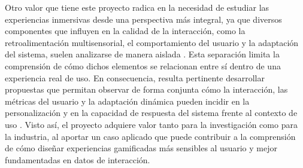 Otro valor que tiene este proyecto radica en la necesidad de estudiar 
las experiencias inmersivas desde una perspectiva más integral, ya que 
diversos componentes que influyen en la calidad de la interacción, como 
la retroalimentación multisensorial, el comportamiento del usuario y la 
adaptación del sistema, suelen analizarse de manera aislada \cite{chen2024interfaces,spittle2023interaction,yeo2024interfaces,lopes2025closing,huber2021dda}.
Esta separación limita la comprensión de cómo dichos elementos se 
relacionan entre sí dentro de una experiencia real de uso. En 
consecuencia, resulta pertinente desarrollar propuestas que permitan 
observar de forma conjunta cómo la interacción, las métricas del 
usuario y la adaptación dinámica pueden incidir en la personalización y 
en la capacidad de respuesta del sistema frente al contexto de uso \cite{lopes2025closing,rashed2025engagement}.
Visto así, el proyecto adquiere valor tanto para la investigación como 
para la industria, al aportar un caso aplicado que puede contribuir a 
la comprensión de cómo diseñar experiencias gamificadas más sensibles 
al usuario y mejor fundamentadas en datos de interacción.